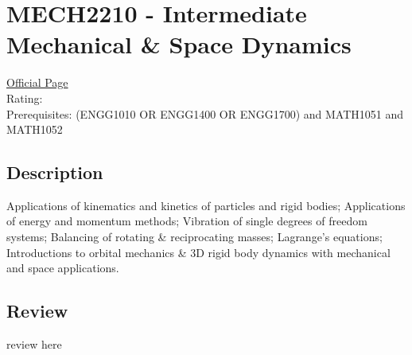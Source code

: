 \hypertarget{MECH2210}{\section{MECH2210 - Intermediate Mechanical \& Space Dynamics}}

\large
\textcolor{turbo_purple}{\href{https://my.uq.edu.au/programs-courses/course.html?course_code=MECH2210}{Official Page}} \\
Rating: \cstar\cstar\cstar\cstar\ostar \\
Prerequisites: (ENGG1010 OR ENGG1400 OR ENGG1700) and MATH1051 and MATH1052

\normalsize
\subsection*{Description}
Applications of kinematics and kinetics of particles and rigid bodies; Applications of energy and momentum methods; Vibration of single degrees of freedom systems; Balancing of rotating \& reciprocating masses; Lagrange's equations; Introductions to orbital mechanics \& 3D rigid body dynamics with mechanical and space applications.

\subsection*{Review}
review here
